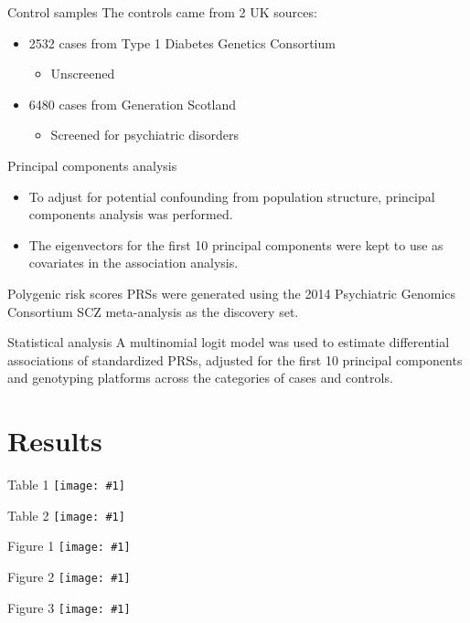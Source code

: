 \documentclass{beamer}
\newcommand*{\solo}[1]{\centering\texttt{[image: \#1]}}
\begin{document}
\begin{frame}{Control samples}
    The controls came from 2 UK sources:
    \begin{itemize}
        \item 2532 cases from Type 1 Diabetes Genetics Consortium
            \begin{itemize}
                \item Unscreened
            \end{itemize}
        \item 6480 cases from Generation Scotland
            \begin{itemize}
                \item Screened for psychiatric disorders
            \end{itemize}
    \end{itemize}
\end{frame}

\begin{frame}{Principal components analysis}
    \begin{itemize}
        \item To adjust for potential confounding from population structure, principal components analysis was performed.
        \item The eigenvectors for the first 10 principal components were kept to use as covariates in the association analysis.
    \end{itemize}
\end{frame}

\begin{frame}{Polygenic risk scores}
    PRSs were generated using the 2014 Psychiatric Genomics Consortium SCZ
    meta-analysis as the discovery set.
\end{frame}

\begin{frame}{Statistical analysis}
    A multinomial logit model was used to estimate differential associations of
    standardized PRSs, adjusted for the first 10 principal components and
    genotyping platforms across the categories of cases and controls.
\end{frame}

\section{Results}
\begin{frame}{Table 1}
    \solo{T1.eps}
\end{frame}

\begin{frame}{Table 2}
    \solo{T2.eps}
\end{frame}

\begin{frame}{Figure 1}
    \solo{F1.eps}
\end{frame}

\begin{frame}{Figure 2}
    \solo{F2.eps}
\end{frame}

\begin{frame}{Figure 3}
    \solo{F3.eps}
\end{frame}
\end{document}

